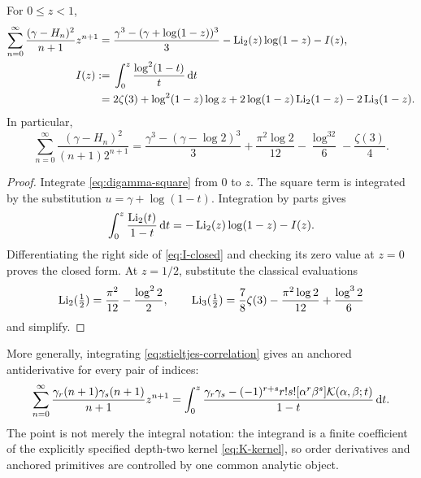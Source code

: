 \begin{theorem}
\label{thm:digamma-square-primitive}
For $0\le z<1$,
\begin{align}
 \sum_{n=0}^{\infty}\frac{(\gamma-H_n)^2}{n+1}z^{n+1}
 ={}&\frac{\gamma^3-(\gamma+\log(1-z))^3}{3}
 -\operatorname{Li}_2(z)\log(1-z)-I(z),
 \label{eq:digamma-primitive}\\
 I(z):={}&\int_0^z\frac{\log^2(1-t)}t\,\mathrm{d} t
 \notag\\
 ={}&2\zeta(3)+\log^2(1-z)\log z
 +2\log(1-z)\operatorname{Li}_2(1-z)-2\operatorname{Li}_3(1-z).
 \label{eq:I-closed}
\end{align}
In particular,
\begin{equation}
 \boxed{\displaystyle
 \sum_{n=0}^{\infty}
 \frac{(\gamma-H_n)^2}{(n+1)2^{n+1}}
 =\frac{\gamma^3-(\gamma-\log2)^3}{3}
 +\frac{\pi^2\log2}{12}-\frac{\log^32}{6}-\frac{\zeta(3)}4.}
 \label{eq:half-digamma-primitive}
\end{equation}
\end{theorem}

\begin{proof}
Integrate \eqref{eq:digamma-square} from $0$ to $z$.  The square term
is integrated by the substitution $u=\gamma+\log(1-t)$.  Integration
by parts gives
\[
 \int_0^z\frac{\operatorname{Li}_2(t)}{1-t}\,\mathrm{d} t
 =-\operatorname{Li}_2(z)\log(1-z)-I(z).
\]
Differentiating the right side of \eqref{eq:I-closed} and checking its
zero value at $z=0$ proves the closed form.  At $z=1/2$, substitute the
classical evaluations
\[
 \operatorname{Li}_2(\tfrac12)=\frac{\pi^2}{12}-\frac{\log^22}{2},
 \qquad
 \operatorname{Li}_3(\tfrac12)=\frac78\zeta(3)-\frac{\pi^2\log2}{12}
                  +\frac{\log^32}{6}
\]
and simplify.
\end{proof}

More generally, integrating \eqref{eq:stieltjes-correlation} gives an
anchored antiderivative for every pair of indices:
\begin{equation}
 \sum_{n=0}^{\infty}
 \frac{\gamma_r(n+1)\gamma_s(n+1)}{n+1}z^{n+1}
 =\int_0^z
 \frac{\gamma_r\gamma_s-(-1)^{r+s}r!s!
 [\alpha^r\beta^s]\mathcal{K}(\alpha,\beta;t)}{1-t}\,\mathrm{d} t.
 \label{eq:all-index-primitive}
\end{equation}
The point is not merely the integral notation: the integrand is a
finite coefficient of the explicitly specified depth-two kernel
\eqref{eq:K-kernel}, so order derivatives and anchored primitives are
controlled by one common analytic object.
